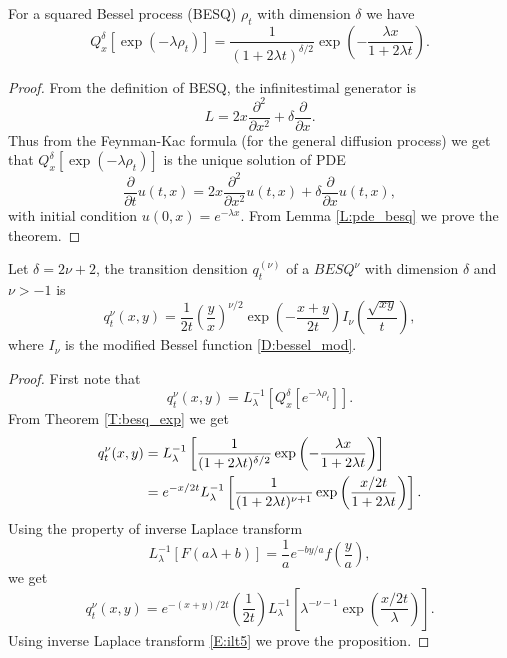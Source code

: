 \begin{theorem} \label{T:besq_exp}
For a squared Bessel process (BESQ) $\rho_t$ with dimension $\delta$ 
we have
\begin{equation}
  Q_x^{\delta}[\exp(-\lambda\rho_t)] 
    = \frac{1}{(1+2\lambda t)^{\delta /2}} 
      \exp \left(-\frac{\lambda x}{1+2\lambda t} \right).
\end{equation}
\begin{proof}
From the definition of BESQ, the infinitestimal generator is 
\[
  L = 2x\frac{\partial^2}{\partial x^2} + \delta\frac{\partial}{\partial x}.
\]
Thus from the Feynman-Kac formula (for the general diffusion process) we get
that $Q_x^{\delta}[\exp(-\lambda\rho_t)]$ is the unique solution of PDE
\[
  \frac{\partial}{\partial t} u(t,x) = 2x \frac{\partial^2}{\partial x^2} u(t,x)
                                  + \delta \frac{\partial}{\partial x} u(t,x),
\]
with initial condition $u(0,x)=e^{-\lambda x}$. From Lemma \ref{L:pde_besq} we
prove the theorem.
\end{proof}
\end{theorem}

\begin{proposition}
Let $\delta=2\nu+2$, the transition densition $q_t^{(\nu)}$ of a $BESQ^{\nu}$
with dimension $\delta$ and $\nu>-1$ is
\begin{equation}
  q_t^{\nu}(x,y) = \frac{1}{2t} \left(\frac{y}{x}\right)^{\nu/2}
    \exp\left( -\frac{x+y}{2t} \right)  I_{\nu}\left(\frac{\sqrt{xy}}{t}\right),
\end{equation}
where $I_{\nu}$ is the modified Bessel function \ref{D:bessel_mod}.
\begin{proof}
First note that
\[
  q_t^{\nu}(x,y) = L_{\lambda}^{-1}[Q_x^{\delta}[e^{-\lambda \rho_t}]].
\]
From Theorem \ref{T:besq_exp} we get
\begin{align*}
  q_t^{\nu}(x,y) 
    &= L_{\lambda}^{-1}
      \left[
        \frac{1}{(1+2\lambda t)^{\delta /2}} 
        \exp \left(-\frac{\lambda x}{1+2\lambda t} \right)
      \right]  \notag \\
    &= e^{-x/2t} L_{\lambda}^{-1}
      \left[
        \frac{1}{(1+2\lambda t)^{\nu+1}} 
        \exp \left(\frac{x/2t}{1+2\lambda t} \right)
      \right].  \notag \\
\end{align*}
Using the property of inverse Laplace transform
\[
  L_{\lambda}^{-1}[F(a\lambda+b)] 
    =\frac{1}{a} e^{-by/a} f\left(\frac{y}{a}\right),
\]
we get
\[
  q_t^{\nu}(x,y) 
    = e^{-(x+y)/2t} \left(\frac{1}{2t}\right)
      L_{\lambda}^{-1}  \left[
        \lambda^{-\nu-1} \exp\left(\frac{x/2t}{\lambda}\right)
      \right].
\]
Using inverse Laplace transform \ref{E:ilt5} we prove the proposition.
\end{proof}
\end{proposition}


